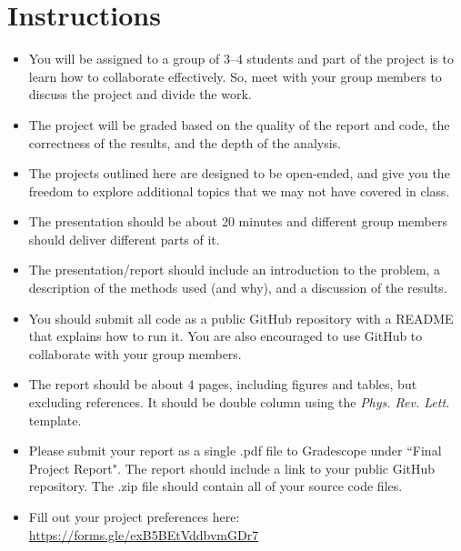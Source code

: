\newif\ifshowsolutions
\showsolutionsfalse

\usepackage[style=phys,
biblabel=brackets,
]{biblatex}
\DeclareSourcemap{
 \maps[datatype=bibtex,overwrite=true]{
  \map{
    \step[fieldsource=Collaboration, final=true]
    \step[fieldset=usera, origfieldval, final=true]
  }
 }
}





\pagestyle{fancy}

\section*{Instructions}
\begin{itemize}
  \item You will be assigned to a group of 3--4 students and part of the project is to learn how to collaborate effectively.
        So, meet with your group members to discuss the project and divide the work.
  \item The project will be graded based on the quality of the report and code, the correctness of the results, and the depth of the analysis.
  \item The projects outlined here are designed to be open-ended, and give you the freedom to explore additional topics that we may not have covered in class.
  \item The presentation should be about 20 minutes and different group members should deliver different parts of it.
  \item The presentation/report should include an introduction to the problem, a description of the methods used (and why), and a discussion of the results.
  \item You should submit all code as a public GitHub repository with a README that explains how to run it.
        You are also encouraged to use GitHub to collaborate with your group members.
  \item The report should be about 4 pages, including figures and tables, but excluding references.
        It should be double column using the \emph{Phys. Rev. Lett.} template.
  \item Please submit your report as a single .pdf file to Gradescope under ``Final Project Report".
        The report should include a link to your public GitHub repository.        The .zip file should contain all of your source code files.
  \item Fill out your project preferences here: \url{https://forms.gle/exB5BEtVddbvmGDr7}
\end{itemize}

